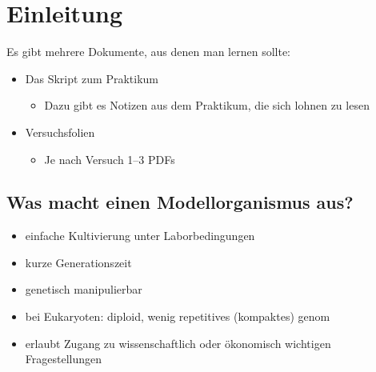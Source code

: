 
\section{Einleitung}\label{sec:einleitung}

Es gibt mehrere Dokumente, aus denen man lernen sollte:

\begin{itemize}
    \item Das Skript zum Praktikum
    \begin{itemize}
        \item Dazu gibt es Notizen aus dem Praktikum, die sich lohnen zu lesen
    \end{itemize}
    \item Versuchsfolien
    \begin{itemize}
        \item Je nach Versuch 1--3 PDFs
    \end{itemize}
\end{itemize}


\subsection{Was macht einen Modellorganismus aus?}\label{subsec:was-macht-einen-modellorganismus-aus?}

\begin{itemize}
    \item einfache Kultivierung unter Laborbedingun\gls{gen}
    \item kurze Generationszeit
    \item \gls{gen}etisch manipulierbar
    \item bei Eukaryoten: diploid, wenig repetitives (kompaktes) \gls{genom}
    \item erlaubt Zugang zu wissenschaftlich oder ökonomisch wichtigen Fragestellun\gls{gen}
\end{itemize}

